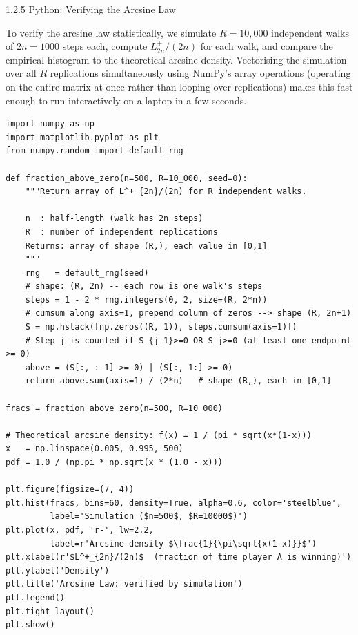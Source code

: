 \documentclass[aspectratio=169,10pt]{beamer}
\begin{document}
\begin{frame}[fragile]{1.2.5 Python: Verifying the Arcsine Law}

  To verify the arcsine law statistically, we simulate $R = 10{,}000$
  independent walks of $2n = 1000$ steps each, compute $L^+_{2n}/(2n)$ for
  each walk, and compare the empirical histogram to the theoretical arcsine
  density.  Vectorising the simulation over all $R$ replications simultaneously
  using NumPy's array operations (operating on the entire matrix at once rather
  than looping over replications) makes this fast enough to run interactively on
  a laptop in a few seconds.

\begin{lstlisting}[style=python]
import numpy as np
import matplotlib.pyplot as plt
from numpy.random import default_rng

def fraction_above_zero(n=500, R=10_000, seed=0):
    """Return array of L^+_{2n}/(2n) for R independent walks.

    n  : half-length (walk has 2n steps)
    R  : number of independent replications
    Returns: array of shape (R,), each value in [0,1]
    """
    rng   = default_rng(seed)
    # shape: (R, 2n) -- each row is one walk's steps
    steps = 1 - 2 * rng.integers(0, 2, size=(R, 2*n))
    # cumsum along axis=1, prepend column of zeros --> shape (R, 2n+1)
    S = np.hstack([np.zeros((R, 1)), steps.cumsum(axis=1)])
    # Step j is counted if S_{j-1}>=0 OR S_j>=0 (at least one endpoint >= 0)
    above = (S[:, :-1] >= 0) | (S[:, 1:] >= 0)
    return above.sum(axis=1) / (2*n)   # shape (R,), each in [0,1]

fracs = fraction_above_zero(n=500, R=10_000)

# Theoretical arcsine density: f(x) = 1 / (pi * sqrt(x*(1-x)))
x   = np.linspace(0.005, 0.995, 500)
pdf = 1.0 / (np.pi * np.sqrt(x * (1.0 - x)))

plt.figure(figsize=(7, 4))
plt.hist(fracs, bins=60, density=True, alpha=0.6, color='steelblue',
         label='Simulation ($n=500$, $R=10000$)')
plt.plot(x, pdf, 'r-', lw=2.2,
         label=r'Arcsine density $\frac{1}{\pi\sqrt{x(1-x)}}$')
plt.xlabel(r'$L^+_{2n}/(2n)$  (fraction of time player A is winning)')
plt.ylabel('Density')
plt.title('Arcsine Law: verified by simulation')
plt.legend()
plt.tight_layout()
plt.show()
\end{lstlisting}

\end{frame}
\end{document}
